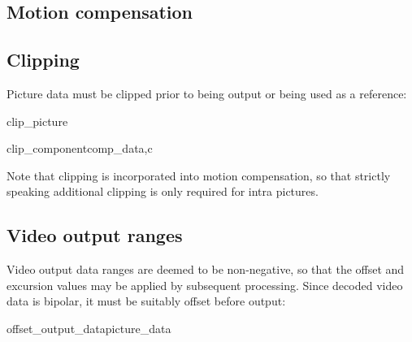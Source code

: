 

\subsection{Motion compensation}


\subsection{Clipping}
\label{pictureclip}

Picture data must be clipped prior to being output or being
used as a reference:

\begin{pseudo}{clip\_picture}{}
\bsEND
\end{pseudo}


\begin{pseudo}{clip\_component}{comp\_data,c}
\bsELSE
\bsEND
{}
     \bsEND
\bsEND
\end{pseudo}

\begin{informative}
Note that clipping is incorporated into motion compensation, so that strictly speaking additional
clipping is only required for intra pictures.
\end{informative}

\subsection{Video output ranges}
\label{videooutput}

Video output data ranges are deemed to be non-negative, so that the offset and excursion
 values may be applied by subsequent processing. Since decoded video data is bipolar, it must be suitably offset before output:

\begin{pseudo}{offset\_output\_data}{picture\_data}
    \bsELSE
    \bsEND
        \bsEND
    \bsEND
\bsEND
\end{pseudo}